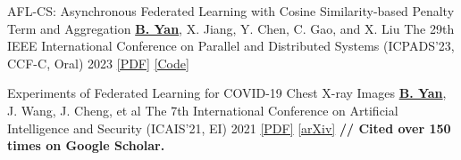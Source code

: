 \begin{cvpublications}

\cvpublication
{AFL-CS: Asynchronous Federated Learning with Cosine Similarity-based Penalty Term and Aggregation} %
{\underline{\textbf{B. Yan}}, X. Jiang, Y. Chen, C. Gao, and X. Liu} %
{The 29th IEEE International Conference on Parallel and Distributed Systems (ICPADS'23, CCF-C, Oral)} %
{2023} %
{\href{https://ieeexplore.ieee.org/document/10476054}{[PDF]} \href{https://github.com/beiyuouo/AFL-CS-ICPADS}{[Code]}} %


\cvpublication
{Experiments of Federated Learning for COVID-19 Chest X-ray Images} %
{\underline{\textbf{B. Yan}}, J. Wang, J. Cheng, et al} %
{The 7th International Conference on Artificial Intelligence and Security (ICAIS'21, EI)} %
{2021} %
{
	\href{https://link.springer.com/chapter/10.1007/978-3-030-78618-2_4}{[PDF]} \href{https://arxiv.org/abs/2007.05592}{[arXiv]}
	\textbf{ // Cited over 150 times on Google Scholar.} 
} %







\end{cvpublications}




